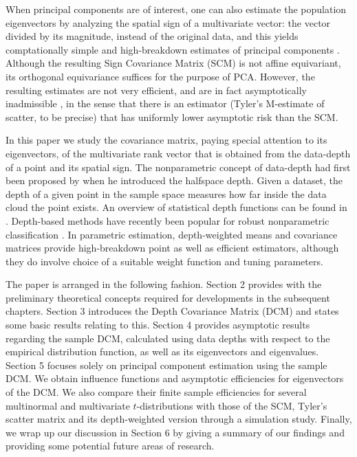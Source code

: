 \documentclass[fleqn,11pt]{article}
\begin{document}
When principal components are of interest, one can also estimate the population eigenvectors by analyzing the spatial sign of a multivariate vector: the vector divided by its magnitude, instead of the original data, and this yields comptationally simple and high-breakdown estimates of principal components \citep{locantore99, visuri00}. Although the resulting Sign Covariance Matrix (SCM) is not affine equivariant, its orthogonal equivariance suffices for the purpose of PCA. However, the resulting estimates are not very efficient, and are in fact asymptotically inadmissible \citep{magyar14}, in the sense that there is an estimator (Tyler's M-estimate of scatter, to be precise) that has uniformly lower asymptotic risk than the SCM.

In this paper we study the covariance matrix, paying special attention to its eigenvectors, of the multivariate rank vector that is obtained from the data-depth of a point and its spatial sign. The nonparametric concept of data-depth had first been proposed by \cite{tukey75} when he introduced the halfspace depth. Given a dataset, the depth of a given point in the sample space measures how far inside the data cloud the point exists. An overview of statistical depth functions can be found in \citep{zuo00}. Depth-based methods have recently been popular for robust nonparametric classification \citep{jornsten04, ghosh05, dutta12, sguera14}. In parametric estimation, depth-weighted means \citep{ZuoCuiHe04} and covariance matrices \citep{ZuoCui05} provide high-breakdown point as well as efficient estimators, although they do involve choice of a suitable weight function and tuning parameters.

The paper is arranged in the following fashion. Section 2 provides with the preliminary theoretical concepts required for developments in the subsequent chapters. Section 3 introduces the Depth Covariance Matrix (DCM) and states some basic results relating to this. Section 4 provides asymptotic results regarding the sample DCM, calculated using data depths with respect to the empirical distribution function, as well as its eigenvectors and eigenvalues. Section 5 focuses solely on principal component estimation using the sample DCM. We obtain influence functions and asymptotic efficiencies for eigenvectors of the DCM. We also compare their finite sample efficiencies for several multinormal and multivariate $t$-distributions with those of the SCM, Tyler's scatter matrix and its depth-weighted version through a simulation study. Finally, we wrap up our discussion in Section 6 by giving a summary of our findings and providing some potential future areas of research.
\end{document}
